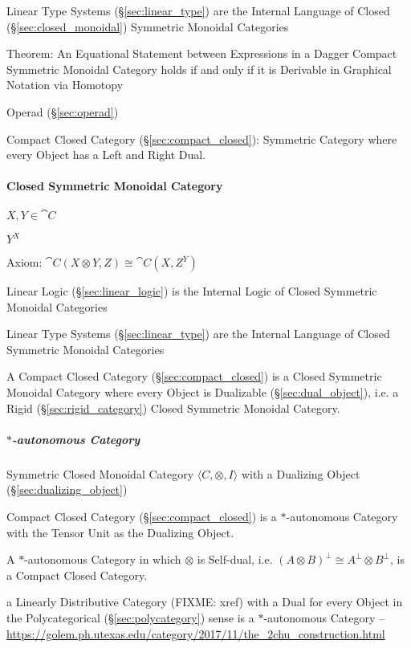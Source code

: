 Linear Type Systems (\S\ref{sec:linear_type}) are the Internal
Language of Closed (\S\ref{sec:closed_monoidal}) Symmetric Monoidal
Categories

Theorem: An Equational Statement between Expressions in a Dagger
Compact Symmetric Monoidal Category holds if and only if it is
Derivable in Graphical Notation via Homotopy %

Operad (\S\ref{sec:operad})

Compact Closed Category (\S\ref{sec:compact_closed}): Symmetric
Category where every Object has a Left and Right Dual.



\paragraph{Closed Symmetric Monoidal Category}\hfill
\label{sec:closed_symmetric_monoidal}

$X, Y \in \cat{C}$

$Y^X$

Axiom: $\cat{C}(X \otimes Y, Z) \cong \cat{C}(X, Z^Y)$

Linear Logic (\S\ref{sec:linear_logic}) is the Internal Logic of
Closed Symmetric Monoidal Categories

Linear Type Systems (\S\ref{sec:linear_type}) are the Internal
Language of Closed Symmetric Monoidal Categories

A Compact Closed Category (\S\ref{sec:compact_closed}) is a Closed
Symmetric Monoidal Category where every Object is Dualizable
(\S\ref{sec:dual_object}), i.e. a Rigid (\S\ref{sec:rigid_category})
Closed Symmetric Monoidal Category.



\subparagraph{$*$-autonomous Category}\label{sec:star_autonomous}\hfill

Symmetric Closed Monoidal Category $\langle C, \otimes, I \rangle$
with a Dualizing Object (\S\ref{sec:dualizing_object})

Compact Closed Category (\S\ref{sec:compact_closed}) is a
$*$-autonomous Category with the Tensor Unit as the Dualizing Object.

A $*$-autonomous Category in which $\otimes$ is Self-dual, i.e. $(A
\otimes B)^\bot \cong A^\bot \otimes B^\bot$, is a Compact Closed
Category. \cite{abramsky-gay-nagarajan96}

a Linearly Distributive Category (FIXME: xref) with a Dual for every Object in
the Polycategorical (\S\ref{sec:polycategory}) sense is a $*$-autonomous
Category
--\url{https://golem.ph.utexas.edu/category/2017/11/the_2chu_construction.html}

